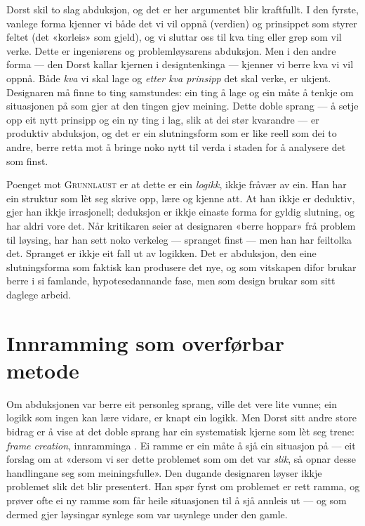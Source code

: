 Dorst skil to slag abduksjon, og det er her argumentet blir kraftfullt. I den fyrste, vanlege forma kjenner vi både det vi vil oppnå (verdien) og prinsippet som styrer feltet (det «korleis» som gjeld), og vi sluttar oss til kva ting eller grep som vil verke. Dette er ingeniørens og problemløysarens abduksjon. Men i den andre forma — den Dorst kallar kjernen i designtenkinga — kjenner vi berre kva vi vil oppnå. Både \emph{kva} vi skal lage og \emph{etter kva prinsipp} det skal verke, er ukjent. Designaren må finne to ting samstundes: ein ting å lage og ein måte å tenkje om situasjonen på som gjer at den tingen gjev meining. Dette doble sprang — å setje opp eit nytt prinsipp og ein ny ting i lag, slik at dei stør kvarandre — er produktiv abduksjon, og det er ein slutningsform som er like reell som dei to andre, berre retta mot å bringe noko nytt til verda i staden for å analysere det som finst.

Poenget mot \textsc{Grunnlaust} er at dette er ein \emph{logikk}, ikkje fråvær av ein. Han har ein struktur som lèt seg skrive opp, lære og kjenne att. At han ikkje er deduktiv, gjer han ikkje irrasjonell; deduksjon er ikkje einaste forma for gyldig slutning, og har aldri vore det. Når kritikaren seier at designaren «berre hoppar» frå problem til løysing, har han sett noko verkeleg — spranget finst — men han har feiltolka det. Spranget er ikkje eit fall ut av logikken. Det er abduksjon, den eine slutningsforma som faktisk kan produsere det nye, og som vitskapen difor brukar berre i si famlande, hypotesedannande fase, men som design brukar som sitt daglege arbeid.

\section{Innramming som overførbar metode}

Om abduksjonen var berre eit personleg sprang, ville det vere lite vunne; ein logikk som ingen kan lære vidare, er knapt ein logikk. Men Dorst sitt andre store bidrag er å vise at det doble sprang har ein systematisk kjerne som lèt seg trene: \emph{frame creation}, innramminga \autocite{dorst2015frame}. Ei ramme er ein måte å sjå ein situasjon på — eit forslag om at «dersom vi ser dette problemet som om det var \emph{slik}, så opnar desse handlingane seg som meiningsfulle». Den dugande designaren løyser ikkje problemet slik det blir presentert. Han spør fyrst om problemet er rett ramma, og prøver ofte ei ny ramme som får heile situasjonen til å sjå annleis ut — og som dermed gjer løysingar synlege som var usynlege under den gamle.

